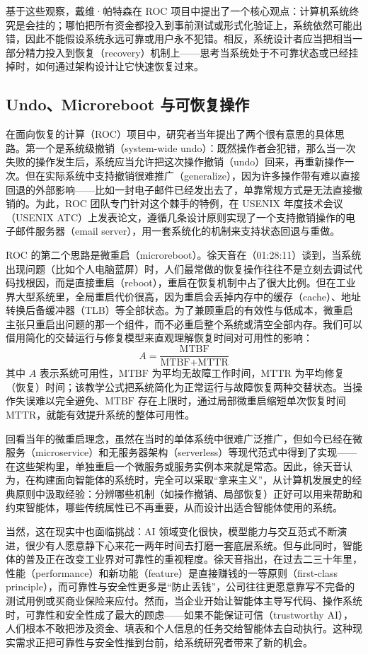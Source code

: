 \documentclass[UTF8,a4paper,11pt,fontset=fandol]{ctexart}
\begin{document}
基于这些观察，戴维·帕特森在 ROC 项目中提出了一个核心观点：计算机系统终究是会挂的；哪怕把所有资金都投入到事前测试或形式化验证上，系统依然可能出错，因此不能假设系统永远可靠或用户永不犯错。相反，系统设计者应当把相当一部分精力投入到恢复（recovery）机制上——思考当系统处于不可靠状态或已经挂掉时，如何通过架构设计让它快速恢复过来。

\subsection{Undo、Microreboot 与可恢复操作}
在面向恢复的计算（ROC）项目中，研究者当年提出了两个很有意思的具体思路。第一个是系统级撤销（system-wide undo）：既然操作者会犯错，那么当一次失败的操作发生后，系统应当允许把这次操作撤销（undo）回来，再重新操作一次。但在实际系统中支持撤销很难推广（generalize），因为许多操作带有难以直接回退的外部影响——比如一封电子邮件已经发出去了，单靠常规方式是无法直接撤销的。为此，ROC 团队专门针对这个棘手的特例，在 USENIX 年度技术会议（USENIX ATC）上发表论文，遵循几条设计原则实现了一个支持撤销操作的电子邮件服务器（email server），用一套系统化的机制来支持状态回退与重做。

ROC 的第二个思路是微重启（microreboot）。徐天音在（01:28:11）谈到，当系统出现问题（比如个人电脑蓝屏）时，人们最常做的恢复操作往往不是立刻去调试代码找根因，而是直接重启（reboot），重启在恢复机制中占了很大比例。但在工业界大型系统里，全局重启代价很高，因为重启会丢掉内存中的缓存（cache）、地址转换后备缓冲器（TLB）等全部状态。为了兼顾重启的有效性与低成本，微重启主张只重启出问题的那一个组件，而不必重启整个系统或清空全部内存。我们可以借用简化的交替运行与修复模型来直观理解恢复时间对可用性的影响：
\[
A = \frac{\text{MTBF}}{\text{MTBF} + \text{MTTR}}
\]
其中 \(A\) 表示系统可用性，\(\text{MTBF}\) 为平均无故障工作时间，\(\text{MTTR}\) 为平均修复（恢复）时间；该教学公式把系统简化为正常运行与故障恢复两种交替状态。当操作失误难以完全避免、\(\text{MTBF}\) 存在上限时，通过局部微重启缩短单次恢复时间 \(\text{MTTR}\)，就能有效提升系统的整体可用性。

回看当年的微重启理念，虽然在当时的单体系统中很难广泛推广，但如今已经在微服务（microservice）和无服务器架构（serverless）等现代范式中得到了实现——在这些架构里，单独重启一个微服务或服务实例本来就是常态。因此，徐天音认为，在构建面向智能体的系统时，完全可以采取“拿来主义”，从计算机发展史的经典原则中汲取经验：分辨哪些机制（如操作撤销、局部恢复）正好可以用来帮助和约束智能体，哪些传统属性已不再重要，从而设计出适合智能体使用的系统。

当然，这在现实中也面临挑战：AI 领域变化很快，模型能力与交互范式不断演进，很少有人愿意静下心来花一两年时间去打磨一套底层系统。但与此同时，智能体的普及正在改变工业界对可靠性的重视程度。徐天音指出，在过去二三十年里，性能（performance）和新功能（feature）是直接赚钱的一等原则（first-class principle），而可靠性与安全性更多是“防止丢钱”，公司往往更愿意靠写不完备的测试用例或买商业保险来应付。然而，当企业开始让智能体主导写代码、操作系统时，可靠性和安全性成了最大的顾虑——如果不能保证可信（trustworthy AI），人们根本不敢把涉及资金、填表和个人信息的任务交给智能体去自动执行。这种现实需求正把可靠性与安全性推到台前，给系统研究者带来了新的机会。
\end{document}
